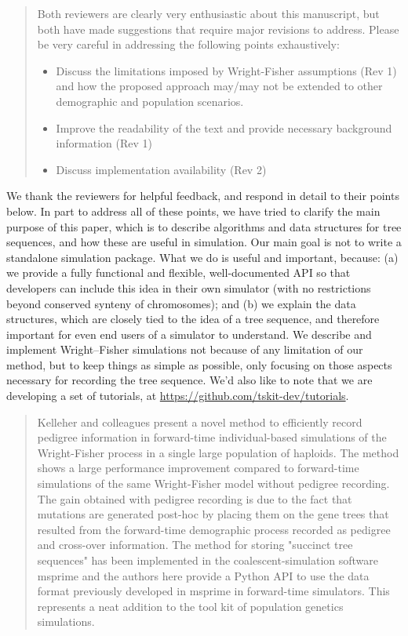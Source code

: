 \begin{quote}
    Both reviewers are clearly very enthusiastic about this manuscript, but both
    have made suggestions that require major revisions to address. Please be
    very careful in addressing the following points exhaustively:
    \begin{itemize}
        \item  Discuss the limitations imposed by Wright-Fisher assumptions (Rev 1) 
            and how the proposed approach may/may not be extended 
            to other demographic and population scenarios.

        \item  Improve the readability of the text and provide necessary background information (Rev 1)

        \item  Discuss implementation availability (Rev 2)
    \end{itemize}
\end{quote}

We thank the reviewers for helpful feedback, and respond in detail to their points below.
In part to address all of these points,
we have tried to clarify the main purpose of this paper, which is
to describe algorithms and data structures for tree sequences,
and how these are useful in simulation.
Our main goal is not to write a standalone simulation package.
What we do is useful and important, because: 
(a) we provide a fully functional and flexible, well-documented API
so that developers can include this idea in their own simulator
(with no restrictions beyond conserved synteny of chromosomes); and
(b) we explain the data structures,
which are closely tied to the idea of a tree sequence,
and therefore important for even end users of a simulator to understand.
We describe and implement Wright--Fisher simulations not because of any limitation of our method,
but to keep things as simple as possible, only focusing on those aspects necessary 
for recording the tree sequence.
We'd also like to note that we are developing a set of tutorials,
at \url{https://github.com/tskit-dev/tutorials}.


\begin{quote}
    Kelleher and colleagues present a novel method to efficiently record pedigree
    information in forward-time individual-based simulations of the Wright-Fisher
    process in a single large population of haploids. The method shows a large
    performance improvement compared to forward-time simulations of the same
    Wright-Fisher model without pedigree recording. The gain obtained with pedigree
    recording is due to the fact that mutations are generated post-hoc by placing
    them on the gene trees that resulted from the forward-time demographic process
    recorded as pedigree and cross-over information. The method for storing
    "succinct tree sequences" has been implemented in the coalescent-simulation
    software msprime and the authors here provide a Python API to use the data
    format previously developed in msprime in forward-time simulators. This
    represents a neat addition to the tool kit of population genetics simulations.
\end{quote}

